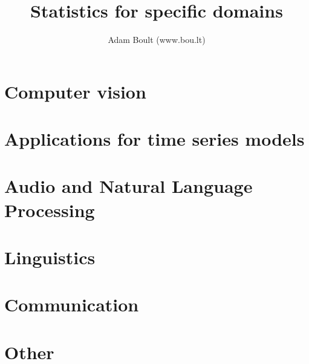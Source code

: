 \documentclass[oneside]{book}
\begin{document}
\author{Adam Boult (www.bou.lt)}
\title{Statistics for specific domains}
\maketitle

\setcounter{tocdepth}{0}
\tableofcontents



\part{Computer vision}





\part{Applications for time series models}





\part{Audio and Natural Language Processing}




\part{Linguistics}




\part{Communication}





\part{Other}

\end{document}
